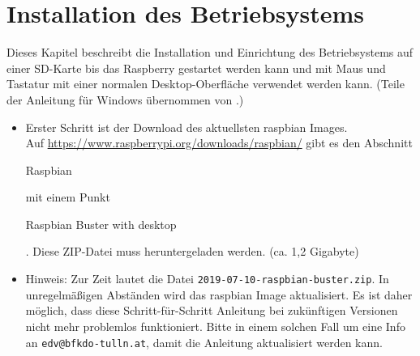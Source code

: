 \label{sec:schritte}

\section{Installation des Betriebsystems}
\label{sec:stepsinstall}
Dieses Kapitel beschreibt die Installation und Einrichtung des Betriebsystems auf einer SD-Karte bis das Raspberry gestartet werden kann und mit Maus und Tastatur mit einer normalen Desktop-Oberfläche verwendet werden kann. (Teile der Anleitung für Windows übernommen von \cite{install}.)

\begin{itemize}

	\item {Erster Schritt ist der Download des aktuellsten raspbian Images.\\
		Auf \url{https://www.raspberrypi.org/downloads/raspbian/} gibt es den Abschnitt \begin{em}Raspbian\end{em} mit einem Punkt \begin{em}Raspbian Buster with desktop\end{em}. 
		Diese ZIP-Datei muss heruntergeladen werden.
		(ca. 1,2 Gigabyte)
		}
	\item {Hinweis: Zur Zeit lautet die Datei \lstinline|2019-07-10-raspbian-buster.zip|.
		In unregelmäßigen Abständen wird das raspbian Image aktualisiert.
		Es ist daher möglich, dass diese Schritt-für-Schritt Anleitung bei zukünftigen Versionen nicht mehr problemlos funktioniert.
		Bitte in einem solchen Fall um eine Info an \verb|edv@bfkdo-tulln.at|, damit die Anleitung aktualisiert werden kann.\\
}
\end{itemize}
